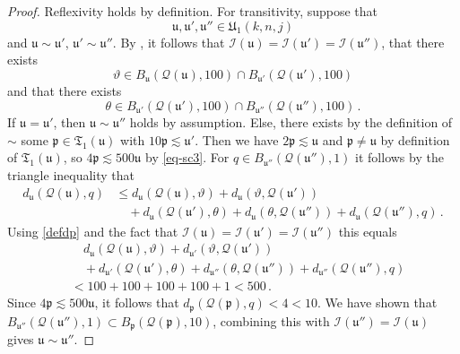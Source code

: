 \documentclass[10pt,a4paper]{article}
\theoremstyle{plain}
\theoremstyle{definition}
\numberwithin{equation}{subsection}
\newcommand{\fp}{{\mathfrak p}}
\newcommand{\fu}{{\mathfrak u}}
\newcommand{\fU}{{\mathfrak U}}
\newcommand{\scI}{{\mathcal{I}}} %
\newcommand{\mfa}{{\vartheta}}
\newcommand{\mfb}{{\theta}}
\newcommand{\fcc}{{\mathcal{Q}}}
\newcommand{\leanok}{}
\begin{document}
\begin{proof}
    \leanok
    Reflexivity holds by definition.
    For transitivity, suppose that
    \begin{equation*}
        \fu, \fu', \fu'' \in \fU_1(k,n,j)
    \end{equation*}
    and $\fu \sim \fu'$, $\fu' \sim \fu''$.
    By , it follows that $\scI(\fu) =\scI(\fu') = \scI(\fu'')$, that there exists
    \begin{equation*}
        \mfa \in B_{\fu}(\fcc(\fu), 100) \cap B_{\fu'}(\fcc(\fu'), 100)
    \end{equation*}
    and that there exists
    \begin{equation*}
        \mfb \in B_{\fu'}(\fcc(\fu'), 100) \cap B_{\fu''}(\fcc(\fu''), 100)\, .
    \end{equation*}
    If $\fu = \fu'$, then $\fu \sim \fu''$ holds by assumption. Else, there exists by the definition of $\sim$ some $\fp \in \mathfrak{T}_1(\fu)$ with $10\fp\lesssim \fu'$.
    Then we have $2\fp \lesssim \fu$ and $\fp \ne \fu$ by definition of $\mathfrak{T}_1(\fu)$, so $4 \fp \lesssim 500 \fu$ by \eqref{eq-sc3}. For $q \in B_{\fu''}(\fcc(\fu''), 1)$ it follows by the triangle inequality that
    \begin{align*}
        d_{\fu}(\fcc(\fu), q) &\le d_{\fu}(\fcc(\fu), \mfa) + d_{\fu}(\mfa, \fcc(\fu'))\\
        &\quad+ d_{\fu}(\fcc(\fu'), \mfb) + d_{\fu}(\mfb, \fcc(\fu'')) +
        d_{\fu}(\fcc(\fu''), q)\,.
    \end{align*}
    Using \eqref{defdp} and the fact that $\scI(\fu) = \scI(\fu') = \scI(\fu'')$ this equals
    \begin{align*}
        &\quad d_{\fu}(\fcc(\fu), \mfa) + d_{\fu'}(\mfa, \fcc(\fu'))\\
        &\quad+ d_{\fu'}(\fcc(\fu'), \mfb) + d_{\fu''}(\mfb, \fcc(\fu'')) +
        d_{\fu''}(\fcc(\fu''), q)\\
        &< 100 + 100 + 100 + 100 + 1 < 500\,.
    \end{align*}
    Since $4\fp \lesssim 500 \fu$, it follows that $d_{\fp}(\fcc(\fp), q) < 4 < 10$. We have shown that $B_{\fu''}(\fcc(\fu''), 1) \subset B_{\fp}(\fcc(\fp), 10)$, combining this with $\scI(\fu'') = \scI(\fu)$ gives $\fu \sim \fu''$.


\end{proof}
\end{document}
